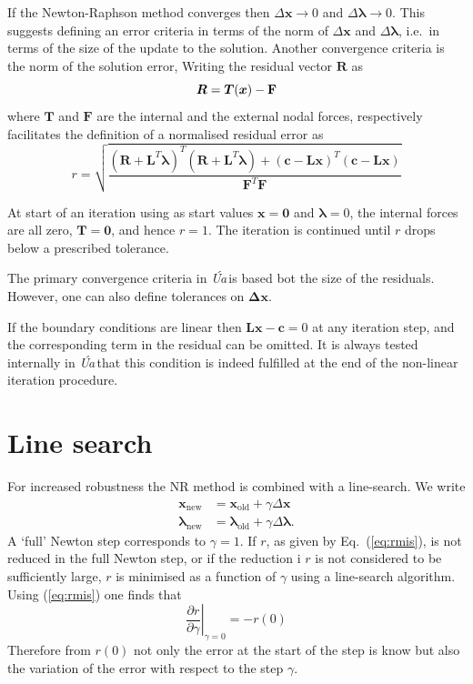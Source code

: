 \documentclass[10pt,a4paper]{book}
\newcommand{\Ua}{\textsl{\'Ua}\,}
\begin{document}
If the Newton-Raphson method converges then $\Delta \bm{x} \to 0$ and
$\Delta \bm{\lambda} \to 0$. This suggests defining an error criteria
in terms of the norm of $\Delta \bm{x}$ and $\Delta \bm{\lambda}$,
i.e.\ in terms of the size of the update to the solution. Another
convergence criteria is the norm of the solution error, Writing the
residual vector $\bm{R}$ as
\[
\bm{R}=\bm{T}(\bm{x})-\bf{F}
\]
where $\bm{T}$ and $\bm{F}$ are the internal and the external nodal
forces, respectively facilitates the definition of a normalised
residual error as
\begin{equation}
r=\sqrt{\frac{(\bm{R}+\bm{L}^T \bm{\lambda})^T (\bm{R}+\bm{L}^T \bm{\lambda}) + (\bm{c} -\bm{L} \bm{x})^T (\bm{c} -\bm{L} \bm{x})} {\bm{F}^T \bm{F}}}
\label{eq:rmis}
\end{equation}

At start of an iteration using as start values $\bm{x}=\bm{0}$ and
$\bm{\lambda}=0$, the internal forces are all zero, $\bm{T}=\bm{0}$,
and hence $r=1$. The iteration is continued until $r$ drops below a
prescribed tolerance.

The primary convergence criteria in \Ua is based bot the size of the
residuals. However, one can also define tolerances on $\bm{\Delta}
\bm{x}$.


If the boundary conditions are linear then
$ \bm{L} \bm{x} - \bm{c} = 0 $ at any iteration step, and the
corresponding term in the residual can be omitted. It is always
tested internally in \Ua that this condition is indeed fulfilled at the end
of the non-linear iteration procedure.

\section{Line search}


For increased robustness the  NR method is combined with a line-search. We write
\begin{align*}
\bm{x}_{\mathrm{new}} &=\bm{x}_{\mathrm{old}}+\gamma \Delta \bm{x}\\
\bm{\lambda}_{\mathrm{new}} &=\bm{\lambda}_{\mathrm{old}}+\gamma \Delta \bm{\lambda}.
\end{align*}
A `full' Newton step corresponds to $\gamma=1$. If $r$, as given by
Eq.~(\ref{eq:rmis}), is not reduced in the full Newton step, or if the
reduction i $r$ is not considered to be sufficiently large, $r$ is
minimised as a function of $\gamma$ using a line-search algorithm.
Using (\ref{eq:rmis}) one finds that
\[
\left . \frac{\partial r}{\partial \gamma} \right |_{\gamma=0} = -r(0)
\]
Therefore from $r(0)$ not only the error at the start of the step is
know but also the variation of the error with respect to the step
$\gamma$.
\end{document}
